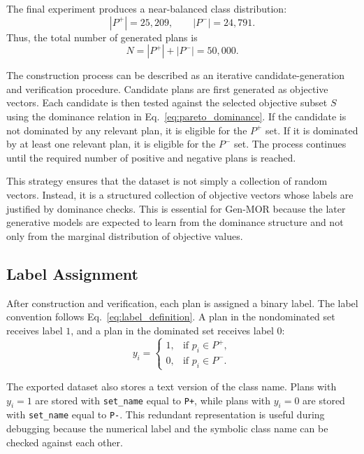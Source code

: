 The final experiment produces a near-balanced class distribution:
\begin{equation}
    |P^{+}| = 25{,}209,
    \qquad
    |P^{-}| = 24{,}791.
    \label{eq:balanced_dataset_counts}
\end{equation}
Thus, the total number of generated plans is
\begin{equation}
    N = |P^{+}| + |P^{-}| = 50{,}000.
    \label{eq:total_dataset_count}
\end{equation}

The construction process can be described as an iterative candidate-generation and verification procedure. Candidate plans are first generated as objective vectors. Each candidate is then tested against the selected objective subset $S$ using the dominance relation in Eq.~\eqref{eq:pareto_dominance}. If the candidate is not dominated by any relevant plan, it is eligible for the $P^{+}$ set. If it is dominated by at least one relevant plan, it is eligible for the $P^{-}$ set. The process continues until the required number of positive and negative plans is reached.

This strategy ensures that the dataset is not simply a collection of random vectors. Instead, it is a structured collection of objective vectors whose labels are justified by dominance checks. This is essential for Gen-MOR because the later generative models are expected to learn from the dominance structure and not only from the marginal distribution of objective values.

\subsection{Label Assignment}
\label{subsec:label_assignment}

After construction and verification, each plan is assigned a binary label. The label convention follows Eq.~\eqref{eq:label_definition}. A plan in the nondominated set receives label $1$, and a plan in the dominated set receives label $0$:
\begin{equation}
    y_i =
    \begin{cases}
        1, & \text{if } p_i \in P^{+},\\
        0, & \text{if } p_i \in P^{-}.
    \end{cases}
    \label{eq:dataset_label_assignment}
\end{equation}

The exported dataset also stores a text version of the class name. Plans with $y_i=1$ are stored with \texttt{set\_name} equal to \texttt{P+}, while plans with $y_i=0$ are stored with \texttt{set\_name} equal to \texttt{P-}. This redundant representation is useful during debugging because the numerical label and the symbolic class name can be checked against each other.

